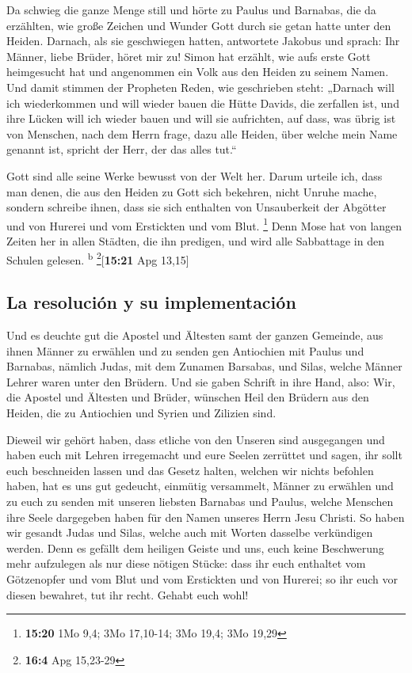  Da schwieg die ganze Menge still und hörte zu Paulus und
Barnabas, die da erzählten, wie große Zeichen und Wunder Gott durch sie
getan hatte unter den Heiden.  Darnach, als sie
geschwiegen hatten, antwortete Jakobus und sprach: Ihr Männer, liebe
Brüder, höret mir zu!  Simon hat erzählt, wie aufs erste
Gott heimgesucht hat und angenommen ein Volk aus den Heiden zu seinem
Namen.  Und damit stimmen der Propheten Reden, wie
geschrieben steht:  „Darnach will ich wiederkommen und
will wieder bauen die Hütte Davids, die zerfallen ist, und ihre Lücken
will ich wieder bauen und will sie aufrichten,  auf dass,
was übrig ist von Menschen, nach dem Herrn frage, dazu alle Heiden, über
welche mein Name genannt ist, spricht der Herr, der das alles tut.``

 Gott sind alle seine Werke bewusst von der Welt her.
 Darum urteile ich, dass man denen, die aus den Heiden zu
Gott sich bekehren, nicht Unruhe mache,  sondern schreibe
ihnen, dass sie sich enthalten von Unsauberkeit der Abgötter und von
Hurerei und vom Erstickten und vom Blut. \footnote{\textbf{15:20} 1Mo
  9,4; 3Mo 17,10-14; 3Mo 19,4; 3Mo 19,29}  Denn Mose hat
von langen Zeiten her in allen Städten, die ihn predigen, und wird alle
Sabbattage in den Schulen gelesen. \textsuperscript{b}
\footnote{\textbf{16:4} Apg 15,23-29}{[}\textbf{15:21} Apg 13,15{]}

\hypertarget{la-resoluciuxf3n-y-su-implementaciuxf3n}{%
\subsection{La resolución y su
implementación}\label{la-resoluciuxf3n-y-su-implementaciuxf3n}}

 Und es deuchte gut die Apostel und Ältesten samt der
ganzen Gemeinde, aus ihnen Männer zu erwählen und zu senden gen
Antiochien mit Paulus und Barnabas, nämlich Judas, mit dem Zunamen
Barsabas, und Silas, welche Männer Lehrer waren unter den Brüdern.
 Und sie gaben Schrift in ihre Hand, also: Wir, die
Apostel und Ältesten und Brüder, wünschen Heil den Brüdern aus den
Heiden, die zu Antiochien und Syrien und Zilizien sind.

 Dieweil wir gehört haben, dass etliche von den Unseren
sind ausgegangen und haben euch mit Lehren irregemacht und eure Seelen
zerrüttet und sagen, ihr sollt euch beschneiden lassen und das Gesetz
halten, welchen wir nichts befohlen haben,  hat es uns
gut gedeucht, einmütig versammelt, Männer zu erwählen und zu euch zu
senden mit unseren liebsten Barnabas und Paulus,  welche
Menschen ihre Seele dargegeben haben für den Namen unseres Herrn Jesu
Christi.  So haben wir gesandt Judas und Silas, welche
auch mit Worten dasselbe verkündigen werden.  Denn es
gefällt dem heiligen Geiste und uns, euch keine Beschwerung mehr
aufzulegen als nur diese nötigen Stücke:  dass ihr euch
enthaltet vom Götzenopfer und vom Blut und vom Erstickten und von
Hurerei; so ihr euch vor diesen bewahret, tut ihr recht. Gehabt euch
wohl!

